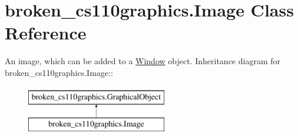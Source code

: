 \hypertarget{classbroken__cs110graphics_1_1Image}{
\section{broken\_\-cs110graphics.Image Class Reference}
\label{classbroken__cs110graphics_1_1Image}
}


An image, which can be added to a \hyperlink{classbroken__cs110graphics_1_1Window}{Window} object.  
Inheritance diagram for broken\_\-cs110graphics.Image::\begin{figure}[H]
\begin{center}
\leavevmode
\includegraphics[height=2cm]{classbroken__cs110graphics_1_1Image}
\end{center}
\end{figure}

